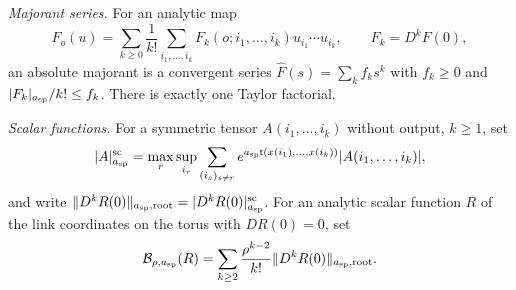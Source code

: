 \begin{definition}
\emph{Majorant series.} For an analytic map
\[
 F_o(u)=\sum_{k\ge0}\frac1{k!}\sum_{i_1,\dots,i_k}F_k(o;i_1,\dots,i_k)u_{i_1}\cdots u_{i_k},\qquad F_k=D^kF(0),
\]
an absolute majorant is a convergent series $\widehat F(s)=\sum_kf_ks^k$ with $f_k\ge0$ and $\lvert F_k\rvert_{a_{\mathrm{sp}}}/k!\le f_k$. There is exactly one Taylor factorial.

\emph{Scalar functions.} For a symmetric tensor $A(i_1,\dots,i_k)$ without output, $k\ge1$, set
\begin{equation}\label{ch01:eq:scalar-root}
 \lvert A\rvert^{\mathrm{sc}}_{a_{\mathrm{sp}}}=\max_r\sup_{i_r}\sum_{(i_s)_{s\ne r}}e^{a_{\mathrm{sp}}\mathsf t(x(i_1),\dots,x(i_k))}\lvert A(i_1,\dots,i_k)\rvert,
\end{equation}
and write $\lVert D^kR(0)\rVert_{a_{\mathrm{sp}},\mathrm{root}}=\lvert D^kR(0)\rvert^{\mathrm{sc}}_{a_{\mathrm{sp}}}$. For an analytic scalar function $R$ of the link coordinates on the torus with $DR(0)=0$, set
\[
 \mathcal B_{\rho,a_{\mathrm{sp}}}(R)=\sum_{k\ge2}\frac{\rho^{k-2}}{k!}\lVert D^kR(0)\rVert_{a_{\mathrm{sp}},\mathrm{root}}.
\]


\end{definition}
